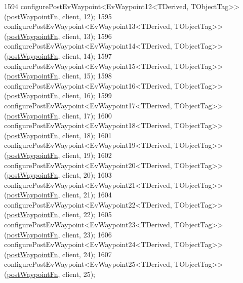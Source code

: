 \begin{DoxyCode}
1594     configurePostEvWaypoint<EvWaypoint12<TDerived, TObjectTag>>(\hyperlink{classmove__base__z__client_1_1WaypointEventDispatcher_acc538eb7506c13f7cca2268a1742dadd}{postWaypointFn}, client, 12);
1595     configurePostEvWaypoint<EvWaypoint13<TDerived, TObjectTag>>(\hyperlink{classmove__base__z__client_1_1WaypointEventDispatcher_acc538eb7506c13f7cca2268a1742dadd}{postWaypointFn}, client, 13);
1596     configurePostEvWaypoint<EvWaypoint14<TDerived, TObjectTag>>(\hyperlink{classmove__base__z__client_1_1WaypointEventDispatcher_acc538eb7506c13f7cca2268a1742dadd}{postWaypointFn}, client, 14);
1597     configurePostEvWaypoint<EvWaypoint15<TDerived, TObjectTag>>(\hyperlink{classmove__base__z__client_1_1WaypointEventDispatcher_acc538eb7506c13f7cca2268a1742dadd}{postWaypointFn}, client, 15);
1598     configurePostEvWaypoint<EvWaypoint16<TDerived, TObjectTag>>(\hyperlink{classmove__base__z__client_1_1WaypointEventDispatcher_acc538eb7506c13f7cca2268a1742dadd}{postWaypointFn}, client, 16);
1599     configurePostEvWaypoint<EvWaypoint17<TDerived, TObjectTag>>(\hyperlink{classmove__base__z__client_1_1WaypointEventDispatcher_acc538eb7506c13f7cca2268a1742dadd}{postWaypointFn}, client, 17);
1600     configurePostEvWaypoint<EvWaypoint18<TDerived, TObjectTag>>(\hyperlink{classmove__base__z__client_1_1WaypointEventDispatcher_acc538eb7506c13f7cca2268a1742dadd}{postWaypointFn}, client, 18);
1601     configurePostEvWaypoint<EvWaypoint19<TDerived, TObjectTag>>(\hyperlink{classmove__base__z__client_1_1WaypointEventDispatcher_acc538eb7506c13f7cca2268a1742dadd}{postWaypointFn}, client, 19);
1602     configurePostEvWaypoint<EvWaypoint20<TDerived, TObjectTag>>(\hyperlink{classmove__base__z__client_1_1WaypointEventDispatcher_acc538eb7506c13f7cca2268a1742dadd}{postWaypointFn}, client, 20);
1603     configurePostEvWaypoint<EvWaypoint21<TDerived, TObjectTag>>(\hyperlink{classmove__base__z__client_1_1WaypointEventDispatcher_acc538eb7506c13f7cca2268a1742dadd}{postWaypointFn}, client, 21);
1604     configurePostEvWaypoint<EvWaypoint22<TDerived, TObjectTag>>(\hyperlink{classmove__base__z__client_1_1WaypointEventDispatcher_acc538eb7506c13f7cca2268a1742dadd}{postWaypointFn}, client, 22);
1605     configurePostEvWaypoint<EvWaypoint23<TDerived, TObjectTag>>(\hyperlink{classmove__base__z__client_1_1WaypointEventDispatcher_acc538eb7506c13f7cca2268a1742dadd}{postWaypointFn}, client, 23);
1606     configurePostEvWaypoint<EvWaypoint24<TDerived, TObjectTag>>(\hyperlink{classmove__base__z__client_1_1WaypointEventDispatcher_acc538eb7506c13f7cca2268a1742dadd}{postWaypointFn}, client, 24);
1607     configurePostEvWaypoint<EvWaypoint25<TDerived, TObjectTag>>(\hyperlink{classmove__base__z__client_1_1WaypointEventDispatcher_acc538eb7506c13f7cca2268a1742dadd}{postWaypointFn}, client, 25);

\end{DoxyCode}
